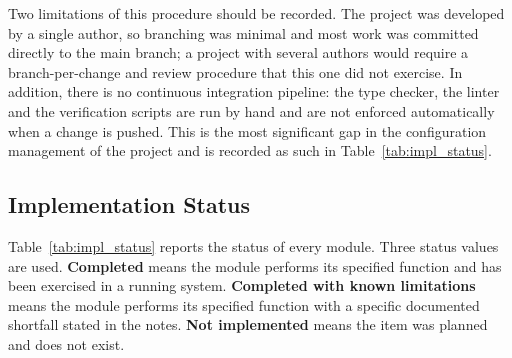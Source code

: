 \documentclass[12pt, oneside]{article} %
\begin{document}
Two limitations of this procedure should be recorded. The project was developed by a single author, so branching was minimal and most work was committed directly to the main branch; a project with several authors would require a branch-per-change and review procedure that this one did not exercise. In addition, there is no continuous integration pipeline: the type checker, the linter and the verification scripts are run by hand and are not enforced automatically when a change is pushed. This is the most significant gap in the configuration management of the project and is recorded as such in Table~\ref{tab:impl_status}.

\subsection{Implementation Status}
\label{sec:impl-status}

Table~\ref{tab:impl_status} reports the status of every module. Three status values are used. \textbf{Completed} means the module performs its specified function and has been exercised in a running system. \textbf{Completed with known limitations} means the module performs its specified function with a specific documented shortfall stated in the notes. \textbf{Not implemented} means the item was planned and does not exist.
\end{document}
